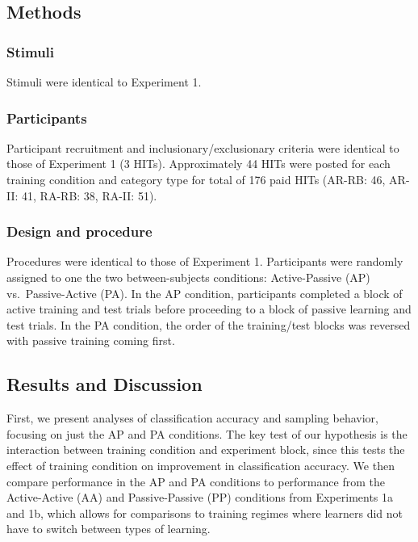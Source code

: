 \documentclass[10pt, letterpaper]{article}
\begin{document}
\subsection{Methods}\label{methods-2}

\subsubsection{Stimuli}\label{stimuli-2}

Stimuli were identical to Experiment 1.

\subsubsection{Participants}\label{participants-2}

Participant recruitment and inclusionary/exclusionary criteria were
identical to those of Experiment 1 (3 HITs). Approximately 44 HITs were
posted for each training condition and category type for total of 176
paid HITs (AR-RB: 46, AR-II: 41, RA-RB: 38, RA-II: 51).

\subsubsection{Design and procedure}\label{design-and-procedure-2}

Procedures were identical to those of Experiment 1. Participants were
randomly assigned to one the two between-subjects conditions:
Active-Passive (AP) vs.~Passive-Active (PA). In the AP condition,
participants completed a block of active training and test trials before
proceeding to a block of passive learning and test trials. In the PA
condition, the order of the training/test blocks was reversed with
passive training coming first.

\subsection{Results and Discussion}\label{results-and-discussion-2}

First, we present analyses of classification accuracy and sampling
behavior, focusing on just the AP and PA conditions. The key test of our
hypothesis is the interaction between training condition and experiment
block, since this tests the effect of training condition on improvement
in classification accuracy. We then compare performance in the AP and PA
conditions to performance from the Active-Active (AA) and
Passive-Passive (PP) conditions from Experiments 1a and 1b, which allows
for comparisons to training regimes where learners did not have to
switch between types of learning.
\end{document}
